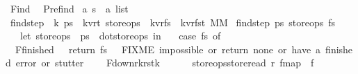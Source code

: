 %
\begin{isabellebody}%
%
%
\isadelimtheory
%
\endisadelimtheory
%
\isatagtheory
{}\isamarkupfalse%
\ Find\ \isanewline
{}\ {\isachardoublequoteopen}Pre{\isacharunderscore}find{\isachardoublequoteclose}\isanewline
{}%
\endisatagtheory
{\isafoldtheory}%
%
\isadelimtheory
\isanewline
%
\endisadelimtheory
\isanewline
\isanewline
{}\isamarkupfalse%
\ {\isacharprime}a\ s\ {\isacharequal}\ {\isachardoublequoteopen}{\isacharprime}a\ list{\isachardoublequoteclose}\isanewline
\isanewline
\isanewline
\isanewline
\isanewline
\isanewline
\isanewline
\isanewline
\isanewline
{}\isamarkupfalse%
\ find{\isacharunderscore}step\ {\isacharcolon}{\isacharcolon}\ {\isachardoublequoteopen}{\isacharprime}k\ ps{}\ {\isasymRightarrow}\ {\isacharparenleft}{\isacharprime}k{\isacharcomma}{\isacharprime}v{\isacharcomma}{\isacharprime}r{\isacharcomma}{\isacharprime}t{\isacharparenright}\ store{\isacharunderscore}ops\ {\isasymRightarrow}\ {\isacharparenleft}{\isacharprime}k{\isacharcomma}{\isacharprime}v{\isacharcomma}{\isacharprime}r{\isacharparenright}fs\ {\isasymRightarrow}\ {\isacharparenleft}{\isacharparenleft}{\isacharprime}k{\isacharcomma}{\isacharprime}v{\isacharcomma}{\isacharprime}r{\isacharparenright}fs{\isacharcomma}{\isacharprime}t{\isacharparenright}\ MM{\isachardoublequoteclose}\ \isanewline
{\isachardoublequoteopen}find{\isacharunderscore}step\ ps{}\ store{\isacharunderscore}ops\ fs\ {\isacharequal}\ {\isacharparenleft}\isanewline
\ \ {\isacharparenleft}{\isacharasterisk}\ let\ store{\isacharunderscore}ops\ {\isacharequal}\ ps{}\ {\isacharbar}{\isachargreater}\ dot{\isacharunderscore}store{\isacharunderscore}ops\ in\ {\isacharasterisk}{\isacharparenright}\isanewline
\ \ case\ fs\ of\ \isanewline
\ \ F{\isacharunderscore}finished\ {\isacharunderscore}\ {\isasymRightarrow}\ {\isacharparenleft}return\ fs{\isacharparenright}\ \ {\isacharparenleft}{\isacharasterisk}\ FIXME\ impossible{\isacharcomma}\ or\ return\ none{\isacharquery}\ or\ have\ a\ finished\ error{\isacharquery}\ or\ stutter{\isacharquery}\ {\isacharasterisk}{\isacharparenright}\isanewline
\ \ {\isacharbar}\ F{\isacharunderscore}down{\isacharparenleft}r{}{\isacharcomma}k{\isacharcomma}r{\isacharcomma}stk{\isacharparenright}\ {\isasymRightarrow}\ {\isacharparenleft}\isanewline
\ \ \ \ {\isacharparenleft}store{\isacharunderscore}ops{\isacharbar}{\isachargreater}store{\isacharunderscore}read{\isacharparenright}\ r\ {\isacharbar}{\isachargreater}fmap\ {\isacharparenleft}{\isacharpercent}\ f{\isachardot}\ \isanewline

\end{isabellebody}
